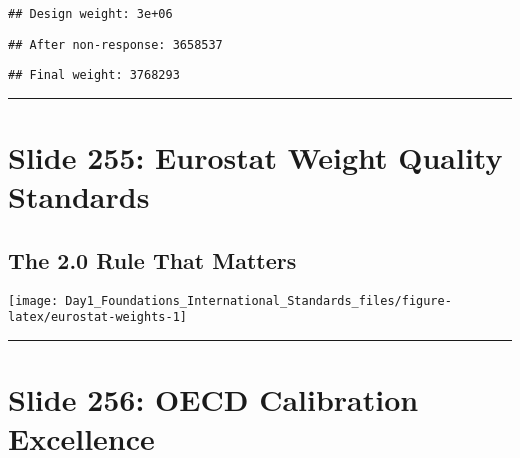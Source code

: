 \documentclass[
]{article}
\newenvironment{Shaded}{\begin{snugshade}}{\end{snugshade}}
\newcommand{\FunctionTok}[1]{\textcolor[rgb]{0.13,0.29,0.53}{\textbf{#1}}}
\newcommand{\NormalTok}[1]{#1}
\newcommand{\SpecialCharTok}[1]{\textcolor[rgb]{0.81,0.36,0.00}{\textbf{#1}}}
\newcommand{\StringTok}[1]{\textcolor[rgb]{0.31,0.60,0.02}{#1}}
\begin{document}
\begin{verbatim}
## Design weight: 3e+06
\end{verbatim}

\begin{Shaded}
\end{Shaded}

\begin{verbatim}
## After non-response: 3658537
\end{verbatim}

\begin{Shaded}
\end{Shaded}

\begin{verbatim}
## Final weight: 3768293
\end{verbatim}

\begin{center}\rule{0.5\linewidth}{0.5pt}\end{center}

\section{Slide 255: Eurostat Weight Quality
Standards}\label{slide-255-eurostat-weight-quality-standards}

\subsection{The 2.0 Rule That Matters}\label{the-2.0-rule-that-matters}

\texttt{[image: Day1\_Foundations\_International\_Standards\_files/figure-latex/eurostat-weights-1]}

\begin{center}\rule{0.5\linewidth}{0.5pt}\end{center}

\section{Slide 256: OECD Calibration
Excellence}\label{slide-256-oecd-calibration-excellence}
\end{document}
